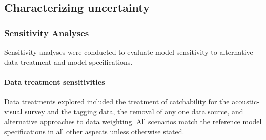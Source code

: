 \documentclass[11pt,
  english,
  letterpaper,
]{article}
\begin{document}
\hypertarget{characterizing-uncertainty}{%
\subsection{Characterizing uncertainty}\label{characterizing-uncertainty}}

\hypertarget{sensitivity-analyses}{%
\subsubsection{Sensitivity Analyses}\label{sensitivity-analyses}}

Sensitivity analyses were conducted to evaluate model sensitivity to alternative data treatment and model specifications.

\hypertarget{data-treatment-sensitivities-1}{%
\paragraph{Data treatment sensitivities}\label{data-treatment-sensitivities-1}}

Data treatments explored included the treatment of catchability for the acoustic-visual survey and the tagging data, the removal of any one data source, and alternative approaches to data weighting. All scenarios match the reference model specifications in all other aspects unless otherwise stated.
\end{document}
